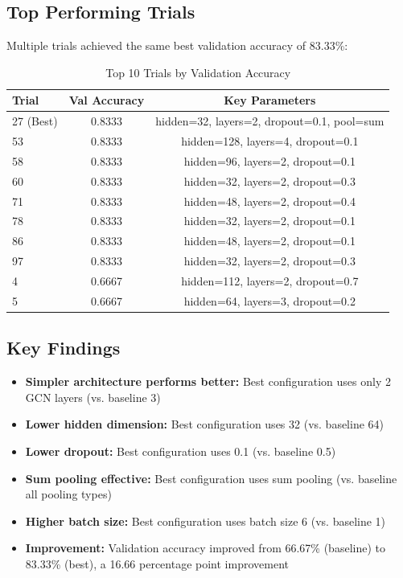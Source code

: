 \documentclass[11pt,a4paper]{article}
\begin{document}
\subsection{Top Performing Trials}

Multiple trials achieved the same best validation accuracy of 83.33\%:

\begin{table}[H]
\centering
\caption{Top 10 Trials by Validation Accuracy}
\begin{tabular}{lcc}
\toprule
\textbf{Trial} & \textbf{Val Accuracy} & \textbf{Key Parameters} \\
\midrule
27 (Best) & 0.8333 & hidden=32, layers=2, dropout=0.1, pool=sum \\
53 & 0.8333 & hidden=128, layers=4, dropout=0.1 \\
58 & 0.8333 & hidden=96, layers=2, dropout=0.1 \\
60 & 0.8333 & hidden=32, layers=2, dropout=0.3 \\
71 & 0.8333 & hidden=48, layers=2, dropout=0.4 \\
78 & 0.8333 & hidden=32, layers=2, dropout=0.1 \\
86 & 0.8333 & hidden=48, layers=2, dropout=0.1 \\
97 & 0.8333 & hidden=32, layers=2, dropout=0.3 \\
4 & 0.6667 & hidden=112, layers=2, dropout=0.7 \\
5 & 0.6667 & hidden=64, layers=3, dropout=0.2 \\
\bottomrule
\end{tabular}
\end{table}

\subsection{Key Findings}

\begin{itemize}
    \item \textbf{Simpler architecture performs better:} Best configuration uses only 2 GCN layers (vs. baseline 3)
    \item \textbf{Lower hidden dimension:} Best configuration uses 32 (vs. baseline 64)
    \item \textbf{Lower dropout:} Best configuration uses 0.1 (vs. baseline 0.5)
    \item \textbf{Sum pooling effective:} Best configuration uses sum pooling (vs. baseline all pooling types)
    \item \textbf{Higher batch size:} Best configuration uses batch size 6 (vs. baseline 1)
    \item \textbf{Improvement:} Validation accuracy improved from 66.67\% (baseline) to 83.33\% (best), a 16.66 percentage point improvement
\end{itemize}
\end{document}
